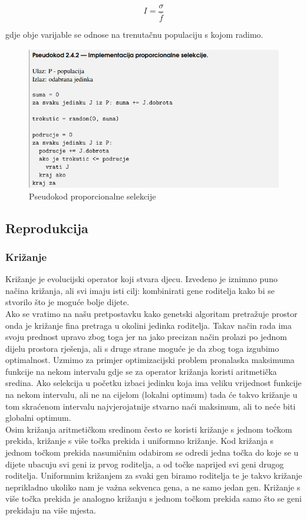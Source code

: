 \documentclass[times, utf8, zavrsni]{fer}
\begin{document}
\begin{equation}
	I=\frac{\sigma}{\bar{f}}
\end{equation}

gdje obje varijable se odnose na trenutačnu populaciju s kojom radimo.

\begin{figure}[!htb]
	\centering
	\includegraphics[width=15cm]{slike/proportionalSel.png}
	\caption{Pseudokod proporcionalne selekcije}
	\label{fig:proportional-selection}
\end{figure}


\subsection{Reprodukcija}

\subsubsection{Križanje}

Križanje je evolucijski operator koji stvara djecu. Izvedeno je iznimno puno načina križanja, ali svi imaju isti cilj: kombinirati gene roditelja kako bi se stvorilo što je moguće bolje dijete. \\Ako se vratimo na našu pretpostavku kako genetski algoritam pretražuje prostor onda je križanje fina pretraga u okolini jedinka roditelja. Takav način rada ima svoju prednost upravo zbog toga jer na jako precizan način prolazi po jednom dijelu prostora rješenja, ali s druge strane moguće je da zbog toga izgubimo optimalnost. Uzmimo za primjer optimizacijski problem pronalaska maksimuma funkcije na nekom intervalu gdje se za operator križanja koristi aritmetička sredina. Ako selekcija u početku izbaci jedinku koja ima veliku vrijednost funkcije na nekom intervalu, ali ne na cijelom (lokalni optimum) tada će takvo križanje u tom skraćenom intervalu najvjerojatnije stvarno naći maksimum, ali to neće biti globalni optimum. \\Osim križanja aritmetičkom sredinom često se koristi križanje s jednom točkom prekida, križanje s više točka prekida i uniformno križanje. Kod križanja s jednom točkom prekida nasumičnim odabirom se odredi jedna točka do koje se u dijete ubacuju svi geni iz prvog roditelja, a od točke naprijed svi geni drugog roditelja. Uniformnim križanjem za svaki gen biramo roditelja te je takvo križanje neprikladno ukoliko nam je važna sekvenca gena, a ne samo jedan gen. Križanje s više točka prekida je analogno križanju s jednom točkom prekida samo što se geni prekidaju na više mjesta.
\end{document}

